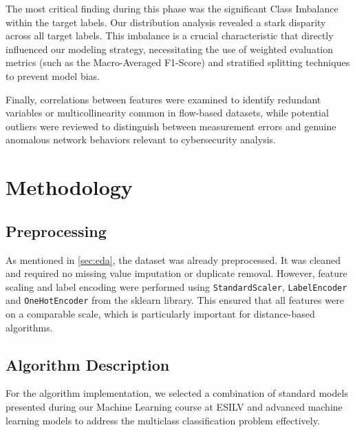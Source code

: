 \documentclass[12pt, a4paper]{article}
\begin{document}
The most critical finding during this phase was the significant Class Imbalance within the target labels. Our distribution analysis revealed a stark disparity across all target labels. This imbalance is a crucial characteristic that directly influenced our modeling strategy, necessitating the use of weighted evaluation metrics (such as the Macro-Averaged F1-Score) and stratified splitting techniques to prevent model bias.

Finally, correlations between features were examined to identify redundant variables or multicollinearity common in flow-based datasets, while potential outliers were reviewed to distinguish between measurement errors and genuine anomalous network behaviors relevant to cybersecurity analysis.



\section{Methodology}

\subsection{Preprocessing}
As mentioned in \ref{sec:eda}, the dataset was already preprocessed. It was cleaned and required no missing value imputation or duplicate removal. However, feature scaling and label encoding were performed using \texttt{StandardScaler}, \texttt{LabelEncoder} and \texttt{OneHotEncoder} from the sklearn library. This ensured that all features were on a comparable scale, which is particularly important for distance-based algorithms.

\subsection{Algorithm Description}

For the algorithm implementation, we selected a combination of standard   models presented during our Machine Learning course at ESILV and advanced machine learning models to address the multiclass classification problem effectively.
\end{document}
